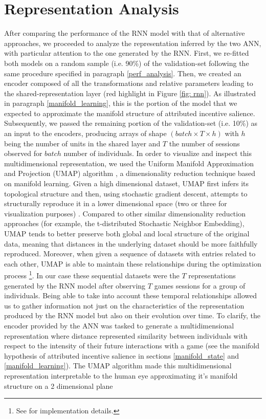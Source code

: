 \section{Representation Analysis}
\lorem
After comparing the performance of the RNN model with that of alternative approaches, we proceeded to analyze the representation inferred by the two ANN, with particular attention to the one generated by the RNN. First, we re-fitted both models on a random sample (i.e. 90\%) of the validation-set following the same procedure specified in paragraph \ref{perf_analysis}. Then, we created an encoder composed of all the transformations and relative parameters leading to the shared-representation layer (red highlight in Figure \ref{fig: rnn}). As illustrated in paragraph \ref{manifold_learning}, this is the portion of the model that we expected to approximate the manifold structure of attributed incentive salience. Subsequently, we passed the remaining portion of the validation-set (i.e. 10\%) as an input to the encoders, producing arrays of shape $(batch\times T \times h)$ with $h$ being the number of units in the shared layer and $T$ the number of sessions observed for $batch$ number of individuals. In order to visualize and inspect this multidimensional representation, we used the Uniform Manifold Approximation and Projection (UMAP) algorithm \cite{2018arXivUMAP}, a dimensionality reduction  technique based on manifold learning. Given a high dimensional dataset, UMAP first infers its topological structure and then, using stochastic gradient descent, attempts to structurally reproduce it in a lower dimensional space (two or three for visualization purposes) \cite{2018arXivUMAP}. Compared to other similar dimensionality reduction approaches (for example, the t-distributed Stochastic Neighbor Embedding), UMAP tends to better preserve both global and local structure of the original data, meaning that distances in the underlying dataset should be more faithfully reproduced. Moreover, when given a sequence of datasets with entries related to each other, UMAP is able to maintain these relationships during the optimization process \footnote{See \cite{alignedumap} for implementation details.}. In our case these sequential datasets were the $T$ representations generated by the RNN model after observing $T$ games sessions for a group of individuals. Being able to take into account these temporal relationships allowed us to gather information not just on the characteristics of the representation produced by the RNN model but also on their evolution over time. To clarify, the encoder provided by the ANN was tasked to generate a multidimensional representation where distance represented similarity between individuals with respect to the intensity of their future interactions with a game (see the manifold hypothesis of attributed incentive salience in sections \ref{manifold_state} and \ref{manifold_learning}). The UMAP algorithm made this multidimensional representation interpretable to the human eye approximating it's manifold structure on a 2 dimensional plane 
